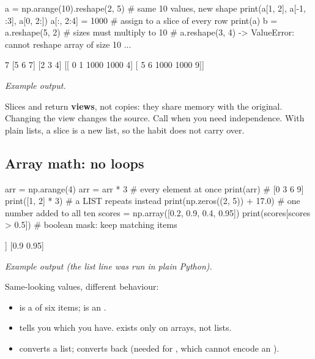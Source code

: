 \begin{pycode}
a = np.arange(10).reshape(2, 5)     # same 10 values, new shape
print(a[1, 2], a[-1, :3], a[0, 2:])
a[:, 2:4] = 1000                    # assign to a slice of every row
print(a)
b = a.reshape(5, 2)                 # sizes must multiply to 10
# a.reshape(3, 4) -> ValueError: cannot reshape array of size 10 ...
\end{pycode}
\begin{rawcode}
7 [5 6 7] [2 3 4]
[[   0    1 1000 1000    4]
 [   5    6 1000 1000    9]]
\end{rawcode}
\noindent\textit{Example output.}

\begin{trap}
Slices and  return \textbf{views}, not copies: they share memory with the original.
Changing the view changes the source. Call  when you need independence. With plain
lists, a slice is a new list, so the habit does not carry over.
\end{trap}

\subsection{Array math: no loops}

\begin{pycode}
arr = np.arange(4)
arr = arr * 3                   # every element at once
print(arr)                      # [0 3 6 9]
print([1, 2] * 3)               # a LIST repeats instead
print(np.zeros((2, 5)) + 17.0)  # one number added to all ten
scores = np.array([0.2, 0.9, 0.4, 0.95])
print(scores[scores > 0.5])     # boolean mask: keep matching items
\end{pycode}
\begin{rawcode}
[0 3 6 9]
[1, 2, 1, 2, 1, 2]
[[17. 17. 17. 17. 17.]
 [17. 17. 17. 17. 17.]]
[0.9  0.95]
\end{rawcode}
\noindent\textit{Example output (the list line was run in plain Python).}

\begin{typecheck}
Same-looking values, different behaviour:
\begin{itemize}[leftmargin=*]
\item {} is a  of six items;  is an
 \code{[3 6]}.
\item {} tells you which you have.  exists only on arrays, not lists.
\item {} converts a list;  converts back (needed for
, which cannot encode an ).
\end{itemize}
\end{typecheck}

